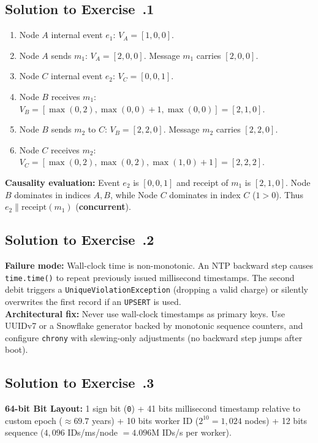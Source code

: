 \subsection*{Solution to Exercise~\thechapter.1}
\begin{enumerate}[leftmargin=18pt]
  \item Node $A$ internal event $e_1$: $V_A = [1, 0, 0]$.
  \item Node $A$ sends $m_1$: $V_A = [2, 0, 0]$. Message $m_1$ carries $[2, 0, 0]$.
  \item Node $C$ internal event $e_2$: $V_C = [0, 0, 1]$.
  \item Node $B$ receives $m_1$: $V_B = [\max(0, 2), \max(0, 0) + 1, \max(0, 0)] = [2, 1, 0]$.
  \item Node $B$ sends $m_2$ to $C$: $V_B = [2, 2, 0]$. Message $m_2$ carries $[2, 2, 0]$.
  \item Node $C$ receives $m_2$: $V_C = [\max(0, 2), \max(0, 2), \max(1, 0) + 1] = [2, 2, 2]$.
\end{enumerate}
\textbf{Causality evaluation:} Event $e_2$ is $[0, 0, 1]$ and receipt of $m_1$ is $[2, 1, 0]$. Node $B$ dominates in indices $A, B$, while Node $C$ dominates in index $C$ ($1 > 0$). Thus $e_2 \parallel \text{receipt}(m_1)$ (\textbf{concurrent}).

\subsection*{Solution to Exercise~\thechapter.2}
\textbf{Failure mode:} Wall-clock time is non-monotonic. An NTP backward step causes \texttt{time.time()} to repeat previously issued millisecond timestamps. The second debit triggers a \texttt{UniqueViolationException} (dropping a valid charge) or silently overwrites the first record if an \texttt{UPSERT} is used.\\
\textbf{Architectural fix:} Never use wall-clock timestamps as primary keys. Use UUIDv7 or a Snowflake generator backed by monotonic sequence counters, and configure \texttt{chrony} with slewing-only adjustments (no backward step jumps after boot).

\subsection*{Solution to Exercise~\thechapter.3}
\textbf{64-bit Bit Layout:} 1 sign bit (\texttt{0}) + 41 bits millisecond timestamp relative to custom epoch ($\approx 69.7$ years) + 10 bits worker ID ($2^{10}=1{,}024$ nodes) + 12 bits sequence ($4{,}096$ IDs/ms/node $= 4.096\text{M}$ IDs/s per worker).


